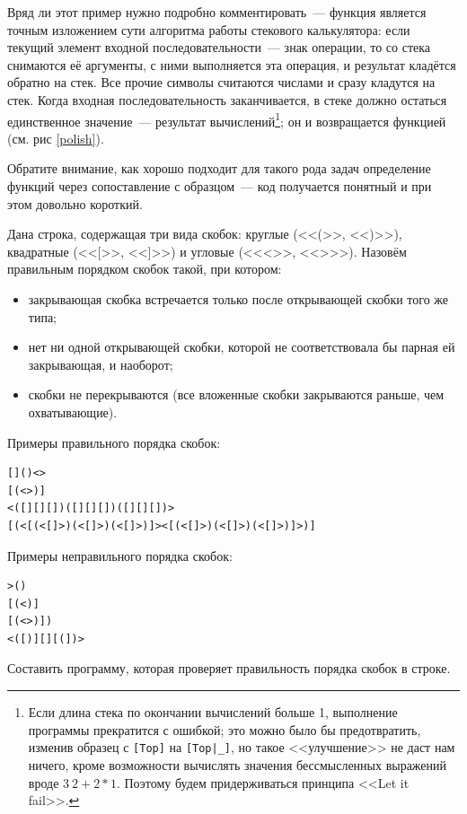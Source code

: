 \documentclass[
  paper=a4,
  fontsize=14pt,
  openany,
  appendixprefix=true
]{scrbook}
\begin{document}
Вряд ли этот пример нужно подробно комментировать~--- функция является точным изложением сути алгоритма работы стекового калькулятора: если текущий элемент входной последовательности~--- знак операции, то со стека снимаются её аргументы, с ними выполняется эта операция, и результат кладётся обратно на стек. Все прочие символы считаются числами и сразу кладутся на стек. Когда входная последовательность заканчивается, в стеке должно остаться единственное значение~--- результат вычислений\footnote{Если длина стека по окончании вычислений больше 1, выполнение программы прекратится с ошибкой; это можно было бы предотвратить, изменив образец с \lstinline![Top]! на \lstinline![Top|_]!, но такое <<улучшение>> не даст нам ничего, кроме возможности вычислять значения бессмысленных выражений вроде $3\ 2 + 2 * 1$. Поэтому будем придерживаться принципа <<Let it fail>>.}; он и возвращается функцией (см. рис \ref{polish}).

Обратите внимание, как хорошо подходит для такого рода задач определение функций через сопоставление с образцом~--- код получается понятный и при этом довольно короткий.

\begin{problem}\label{brackets}
Дана строка, содержащая три вида скобок: круглые (<<(>>, <<)>>), квадратные (<<[>>, <<]>>) и угловые (<<<>>, <<>{}>>). Назовём правильным порядком скобок такой, при котором:
\begin{itemize}
\item закрывающая скобка встречается только после открывающей скобки того же типа;
\item нет ни одной открывающей скобки, которой не соответствовала бы парная ей закрывающая, и наоборот;
\item скобки не перекрываются (все вложенные скобки закрываются раньше, чем охватывающие).
\end{itemize}

Примеры правильного порядка скобок:
\begin{verbatim}
[]()<>
[(<>)]
<([][][])([][][])([][][])>
[(<[(<[]>)(<[]>)(<[]>)]><[(<[]>)(<[]>)(<[]>)]>)]
\end{verbatim}

Примеры неправильного порядка скобок:

\begin{verbatim}
>()
[(<)]
[(<>)])
<([)][][(])>
\end{verbatim}

Составить программу, которая проверяет правильность порядка скобок в строке.\cite[6.1.1]{shen}
\end{problem}
\end{document}
